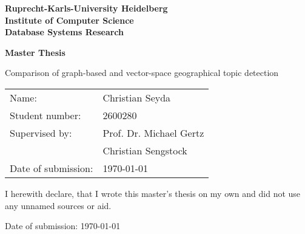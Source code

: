 \documentclass[
     12pt,         %
     a4paper,      %
     BCOR10mm,     %
     DIV14,        %
     listof=totoc,   %
     bibliography=totoc,     %
     index=totoc,     %
     ]{scrreprt}
\begin{document}
\begin{titlepage}


\vspace*{1cm}
\begin{center}
\vspace*{3cm}
\textbf{ 
\Large Ruprecht-Karls-University Heidelberg\\
\smallskip
\Large Institute of Computer Science\\
\smallskip
\Large Database Systems Research\\
\smallskip
}

\vspace{3cm}

\textbf{\large Master Thesis} %

\vspace{0.5\baselineskip}
{\huge
Comparison of graph-based and vector-space geographical topic detection
}
\end{center}

\vfill 

{\large
\begin{tabular}[l]{ll}
Name: & Christian Seyda\\
Student number: & 2600280\\
Supervised by: &  Prof. Dr. Michael Gertz\\
				& Christian Sengstock\\
Date of submission: & \today
\end{tabular}
}

\end{titlepage}

\onehalfspacing

\thispagestyle{empty}

\vspace*{100pt}
\hspace{-1em} I herewith declare, that I wrote this master's thesis on my own and did not use any unnamed sources or aid.
\vspace*{50pt}


Date of submission: \today
\newpage

%
\end{document}
